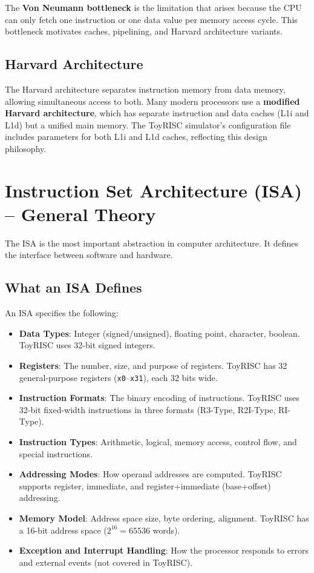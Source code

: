 \documentclass[12pt,a4paper]{article}
\begin{document}
The \textbf{Von Neumann bottleneck} is the limitation that arises because the CPU can only fetch one instruction or one data value per memory access cycle. This bottleneck motivates caches, pipelining, and Harvard architecture variants.

\subsection{Harvard Architecture}

The Harvard architecture separates instruction memory from data memory, allowing simultaneous access to both. Many modern processors use a \textbf{modified Harvard architecture}, which has separate instruction and data caches (L1i and L1d) but a unified main memory. The ToyRISC simulator's configuration file includes parameters for both L1i and L1d caches, reflecting this design philosophy.

\section{Instruction Set Architecture (ISA) -- General Theory}

The ISA is the most important abstraction in computer architecture. It defines the interface between software and hardware.

\subsection{What an ISA Defines}

An ISA specifies the following:

\begin{itemize}[leftmargin=*]
    \item \textbf{Data Types}: Integer (signed/unsigned), floating point, character, boolean. ToyRISC uses 32-bit signed integers.
    \item \textbf{Registers}: The number, size, and purpose of registers. ToyRISC has 32 general-purpose registers (\texttt{x0}--\texttt{x31}), each 32 bits wide.
    \item \textbf{Instruction Formats}: The binary encoding of instructions. ToyRISC uses 32-bit fixed-width instructions in three formats (R3-Type, R2I-Type, RI-Type).
    \item \textbf{Instruction Types}: Arithmetic, logical, memory access, control flow, and special instructions.
    \item \textbf{Addressing Modes}: How operand addresses are computed. ToyRISC supports register, immediate, and register+immediate (base+offset) addressing.
    \item \textbf{Memory Model}: Address space size, byte ordering, alignment. ToyRISC has a 16-bit address space ($2^{16} = 65536$ words).
    \item \textbf{Exception and Interrupt Handling}: How the processor responds to errors and external events (not covered in ToyRISC).
\end{itemize}
\end{document}
